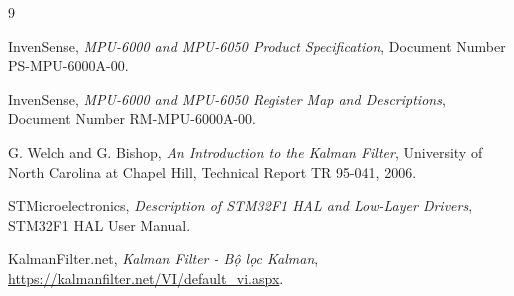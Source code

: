 \documentclass[a4paper,12pt]{report}
\begin{document}

\begin{thebibliography}{9}

InvenSense,
\textit{MPU-6000 and MPU-6050 Product Specification},
Document Number PS-MPU-6000A-00.

InvenSense,
\textit{MPU-6000 and MPU-6050 Register Map and Descriptions},
Document Number RM-MPU-6000A-00.

G. Welch and G. Bishop,
\textit{An Introduction to the Kalman Filter},
University of North Carolina at Chapel Hill,
Technical Report TR 95-041, 2006.

STMicroelectronics,
\textit{Description of STM32F1 HAL and Low-Layer Drivers},
STM32F1 HAL User Manual.

KalmanFilter.net,
\textit{Kalman Filter - Bộ lọc Kalman},
\url{https://kalmanfilter.net/VI/default_vi.aspx}.

\end{thebibliography}
\end{document}
